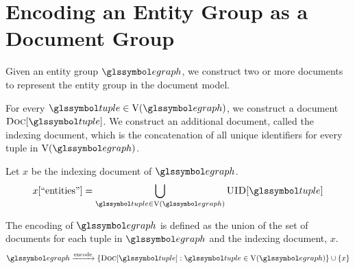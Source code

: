 	\section{Encoding an Entity Group as a Document Group}
	\label{sec:encoding-entity-group-as-document-group}
		Given an entity group \(\egraph\), we construct two or more documents to represent the entity group in the document model.
		
		For every \(\tuple \in \text{V}(\egraph)\), we construct a document \(\docs{\tuple}\).  We construct an additional document, called the indexing document, which is the concatenation of all unique identifiers for every tuple in \(\text{V}(\egraph)\).
		
		Let \(x\) be the indexing document of \(\egraph\).
		\begin{align}
			x[\text{``entities''}] = \bigcup_{\tuple \in \text{V}\left(\egraph\right)} \uid{\tuple}
		\end{align}
		
		The encoding of \(\egraph\) is defined as the union of the set of documents for each tuple in \(\egraph\) and the indexing document, \(x\).
		\begin{align}
			\egraph \xrightarrow{\text{encode}} \{\docs{\tuple} : \tuple \in \text{V}(\egraph)\} \cup \{x\}
		\end{align}
		
